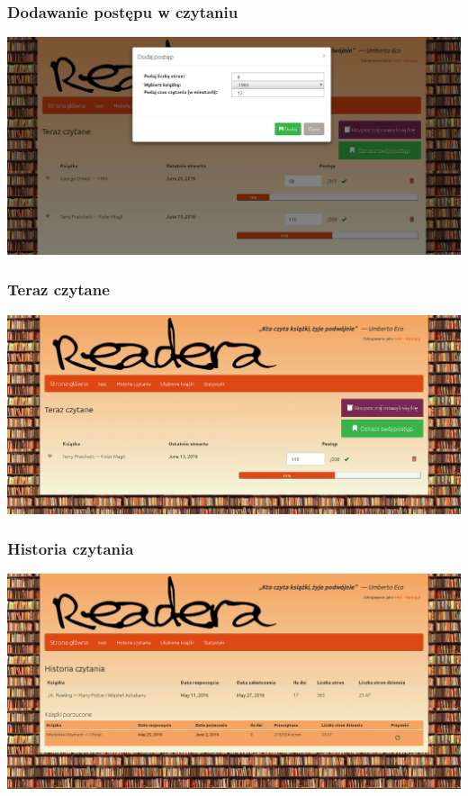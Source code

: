 \documentclass{beamer}
\begin{document}
    \begin{frame}
        \frametitle{Dodawanie postępu w czytaniu}
        \includegraphics[width=\textwidth]{make_progress.png}
    \end{frame}
    \begin{frame}
        \frametitle{Teraz czytane}
        \includegraphics[width=\textwidth]{now_reading.png}
    \end{frame}
    \begin{frame}
        \frametitle{Historia czytania}
        \includegraphics[width=\textwidth]{reading_history.png}
    \end{frame}
\end{document}
